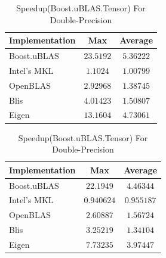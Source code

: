 \begin{table}[ht]
    \centering
    \caption{Speedup(Boost.uBLAS.Tensor) For Single-Precision}
    \begin{tabular}{|l|c|c|}
        \hline
        \textbf{Implementation} & \textbf{Max} & \textbf{Average}\\
        \hline
        Boost.uBLAS         & $23.5192$& $5.36222$ \\
        \hline
        Intel's MKL         & $1.1024$& $1.00799$ \\
        \hline
        OpenBLAS            & $2.92968$& $1.38745$ \\
        \hline
        Blis                & $4.01423$& $1.50807$ \\
        \hline
        Eigen               & $13.1604$& $4.73061$ \\
        \hline
    \end{tabular}

    \vspace*{1 cm}

    \centering
    \caption{Speedup(Boost.uBLAS.Tensor) For Double-Precision}
    \begin{tabular}{|l|c|c|}
        \hline
        \textbf{Implementation} & \textbf{Max} & \textbf{Average}\\
        \hline
        Boost.uBLAS         & $22.1949$& $4.46344$ \\
        \hline
        Intel's MKL         & $0.940624$& $0.955187$ \\
        \hline
        OpenBLAS            & $2.60887$& $1.56724$ \\
        \hline
        Blis                & $3.25219$& $1.34104$ \\
        \hline
        Eigen               & $7.73235$& $3.97447$ \\
        \hline
    \end{tabular}
\end{table}